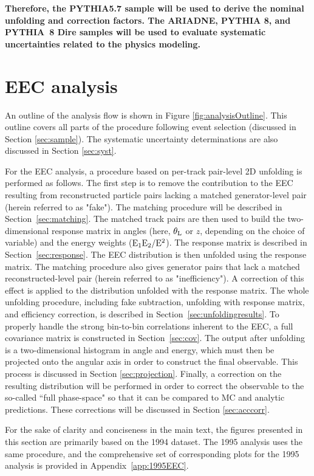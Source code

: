 \documentclass[a4paper,11pt]{article}
\begin{document}
\textbf{Therefore, the PYTHIA5.7 sample will be used to derive the nominal unfolding and correction factors. The ARIADNE, PYTHIA 8, and PYTHIA~8 Dire samples will be used to evaluate systematic uncertainties related to the physics modeling.}

\clearpage
\section{EEC analysis}
\label{sec:analysis}
An outline of the analysis flow is shown in Figure \ref{fig:analysisOutline}. This outline covers all parts of the procedure following event selection (discussed in Section \ref{sec:sample}). The systematic uncertainty determinations are also discussed in Section \ref{sec:syst}. 

For the EEC analysis, a procedure based on per-track pair-level 2D unfolding is performed as follows. The first step is to remove the contribution to the EEC resulting from reconstructed particle pairs lacking a matched generator-level pair (herein referred to as "fake"). The matching procedure will be described in Section~\ref{sec:matching}. The matched track pairs are then used to build the two-dimensional response matrix in angles (here, $\theta_{\rm L}$ or $z$, depending on the choice of variable) and the energy weights ($\rm E_{\rm 1}E_{\rm 2}/E^{2}$). The response matrix is described in Section~\ref{sec:response}. The EEC distribution is then unfolded using the response matrix. The matching procedure also gives generator pairs that lack a matched reconstructed-level pair (herein referred to as "inefficiency"). A correction of this effect is applied to the distribution unfolded with the response matrix. The whole unfolding procedure, including fake subtraction, unfolding with response matrix, and efficiency correction, is described in Section~\ref{sec:unfoldingresults}. To properly handle the strong bin-to-bin correlations inherent to the EEC, a full covariance matrix is constructed in Section~\ref{sec:cov}. The output after unfolding is a two-dimensional histogram in angle and energy, which must then be projected onto the angular axis in order to construct the final observable. This process is discussed in Section \ref{sec:projection}. Finally, a correction on the resulting distribution will be performed in order to correct the observable to the so-called ``full phase-space" so that it can be compared to MC and analytic predictions. These corrections will be discussed in Section \ref{sec:acccorr}.

For the sake of clarity and conciseness in the main text, the figures presented in this section are primarily based on the 1994 dataset. The 1995 analysis uses the same procedure, and the comprehensive set of corresponding plots for the 1995 analysis is provided in Appendix~\ref{app:1995EEC}.
\end{document}
